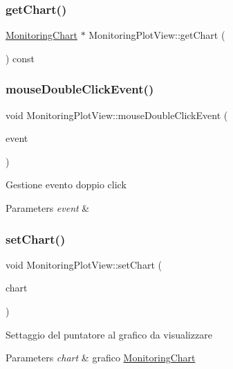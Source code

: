 \subsubsection{\texorpdfstring{get\+Chart()}{getChart()}}
{\footnotesize\ttfamily \hyperlink{class_monitoring_chart}{Monitoring\+Chart} $\ast$ Monitoring\+Plot\+View\+::get\+Chart (\begin{DoxyParamCaption}{ }\end{DoxyParamCaption}) const}

\mbox{\label{class_monitoring_plot_view_af2daa76272f096fe4964ca749eca12ca}} 
\subsubsection{\texorpdfstring{mouse\+Double\+Click\+Event()}{mouseDoubleClickEvent()}}
{\footnotesize\ttfamily void Monitoring\+Plot\+View\+::mouse\+Double\+Click\+Event (\begin{DoxyParamCaption}\item[{Q\+Mouse\+Event $\ast$}]{event }\end{DoxyParamCaption})}

Gestione evento doppio click 
\begin{DoxyParams}{Parameters}
{\em event} & \\
\hline
\end{DoxyParams}
\mbox{\label{class_monitoring_plot_view_ad81016fcd65a1958ce9f29b62ba643ba}} 
\subsubsection{\texorpdfstring{set\+Chart()}{setChart()}}
{\footnotesize\ttfamily void Monitoring\+Plot\+View\+::set\+Chart (\begin{DoxyParamCaption}\item[{\hyperlink{class_monitoring_chart}{Monitoring\+Chart} $\ast$}]{chart }\end{DoxyParamCaption})}

Settaggio del puntatore al grafico da visualizzare 
\begin{DoxyParams}{Parameters}
{\em chart} & grafico \hyperlink{class_monitoring_chart}{Monitoring\+Chart} \\
\hline
\end{DoxyParams}
\mbox{\label{class_monitoring_plot_view_a4dada86aa665a7a835984d57600768db}} 
